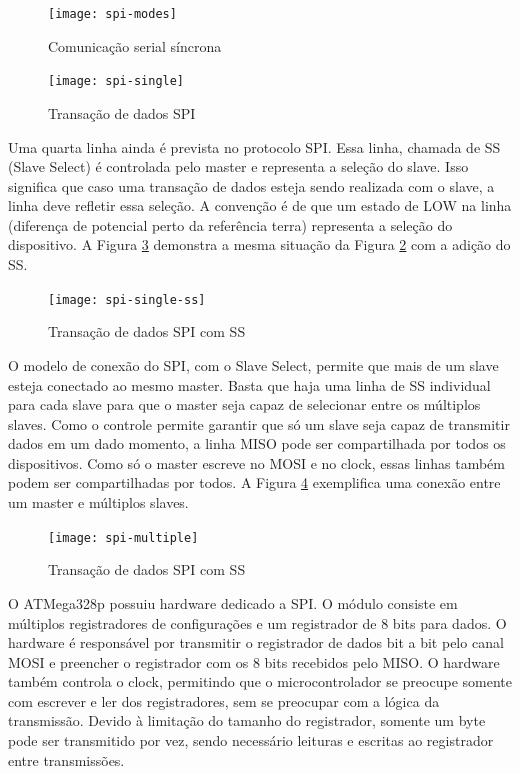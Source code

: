 \documentclass[11pt]{article}
\begin{document}
\begin{figure}
    \centering
    \texttt{[image: spi-modes]}
    \caption{Comunicação serial síncrona}
    \label{figspimodes}
\end{figure}
\begin{figure}
    \centering
    \texttt{[image: spi-single]}
    \caption{Transação de dados SPI}
    \label{figspisingle}
\end{figure}
\par Uma quarta linha ainda é prevista no protocolo SPI. Essa linha, chamada de SS (Slave Select) é controlada pelo master e representa a seleção do slave. Isso significa que caso uma transação de dados esteja sendo realizada com o slave, a linha deve refletir essa seleção. A convenção é de que um estado de LOW na linha (diferença de potencial perto da referência terra) representa a seleção do dispositivo. A Figura \ref{figspisingless} demonstra a mesma situação da Figura \ref{figspisingle} com a adição do SS.
\begin{figure}
    \centering
    \texttt{[image: spi-single-ss]}
    \caption{Transação de dados SPI com SS}
    \label{figspisingless}
\end{figure}
\par O modelo de conexão do SPI, com o Slave Select, permite que mais de um slave esteja conectado ao mesmo master. Basta que haja uma linha de SS individual para cada slave para que o master seja capaz de selecionar entre os múltiplos slaves. Como o controle permite garantir que só um slave seja capaz de transmitir dados em um dado momento, a linha MISO pode ser compartilhada por todos os dispositivos. Como só o master escreve no MOSI e no clock, essas linhas também podem ser compartilhadas por todos. A Figura \ref{figspimultiple} exemplifica uma conexão entre um master e múltiplos slaves.
\begin{figure}
    \centering
    \texttt{[image: spi-multiple]}
    \caption{Transação de dados SPI com SS}
    \label{figspimultiple}
\end{figure}
\par O ATMega328p possuiu hardware dedicado a SPI. O módulo consiste em múltiplos registradores de configurações e um registrador de 8 bits para dados. O hardware é responsável por transmitir o registrador de dados bit a bit pelo canal MOSI e preencher o registrador com os 8 bits recebidos pelo MISO. O hardware também controla o clock, permitindo que o microcontrolador se preocupe somente com escrever e ler dos registradores, sem se preocupar com a lógica da transmissão. Devido à limitação do tamanho do registrador, somente um byte pode ser transmitido por vez, sendo necessário leituras e escritas ao registrador entre transmissões.
\end{document}

